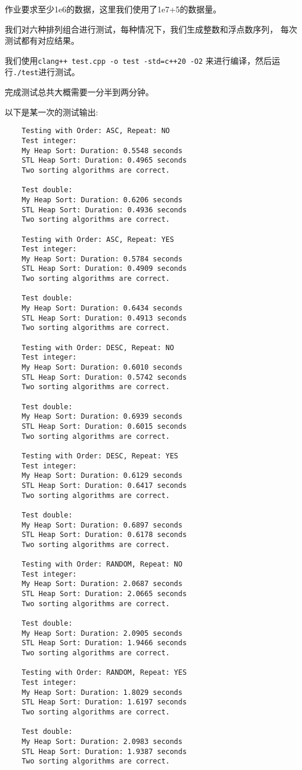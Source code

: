 \documentclass[UTF8]{ctexart}
\begin{document}
作业要求至少1e6的数据，这里我们使用了1e7+5的数据量。

我们对六种排列组合进行测试，每种情况下，我们生成整数和浮点数序列，
每次测试都有对应结果。

我们使用\texttt{clang++ test.cpp -o test -std=c++20 -O2}
来进行编译，然后运行\texttt{./test}进行测试。

完成测试总共大概需要一分半到两分钟。

以下是某一次的测试输出:

\begin{verbatim}
    Testing with Order: ASC, Repeat: NO
    Test integer:
    My Heap Sort: Duration: 0.5548 seconds
    STL Heap Sort: Duration: 0.4965 seconds
    Two sorting algorithms are correct.
    
    Test double:
    My Heap Sort: Duration: 0.6206 seconds
    STL Heap Sort: Duration: 0.4936 seconds
    Two sorting algorithms are correct.
    
    Testing with Order: ASC, Repeat: YES
    Test integer:
    My Heap Sort: Duration: 0.5784 seconds
    STL Heap Sort: Duration: 0.4909 seconds
    Two sorting algorithms are correct.
    
    Test double:
    My Heap Sort: Duration: 0.6434 seconds
    STL Heap Sort: Duration: 0.4913 seconds
    Two sorting algorithms are correct.
    
    Testing with Order: DESC, Repeat: NO
    Test integer:
    My Heap Sort: Duration: 0.6010 seconds
    STL Heap Sort: Duration: 0.5742 seconds
    Two sorting algorithms are correct.
    
    Test double:
    My Heap Sort: Duration: 0.6939 seconds
    STL Heap Sort: Duration: 0.6015 seconds
    Two sorting algorithms are correct.
    
    Testing with Order: DESC, Repeat: YES
    Test integer:
    My Heap Sort: Duration: 0.6129 seconds
    STL Heap Sort: Duration: 0.6417 seconds
    Two sorting algorithms are correct.
    
    Test double:
    My Heap Sort: Duration: 0.6897 seconds
    STL Heap Sort: Duration: 0.6178 seconds
    Two sorting algorithms are correct.
    
    Testing with Order: RANDOM, Repeat: NO
    Test integer:
    My Heap Sort: Duration: 2.0687 seconds
    STL Heap Sort: Duration: 2.0665 seconds
    Two sorting algorithms are correct.
    
    Test double:
    My Heap Sort: Duration: 2.0905 seconds
    STL Heap Sort: Duration: 1.9466 seconds
    Two sorting algorithms are correct.
    
    Testing with Order: RANDOM, Repeat: YES
    Test integer:
    My Heap Sort: Duration: 1.8029 seconds
    STL Heap Sort: Duration: 1.6197 seconds
    Two sorting algorithms are correct.
    
    Test double:
    My Heap Sort: Duration: 2.0983 seconds
    STL Heap Sort: Duration: 1.9387 seconds
    Two sorting algorithms are correct.
\end{verbatim}
\end{document}
